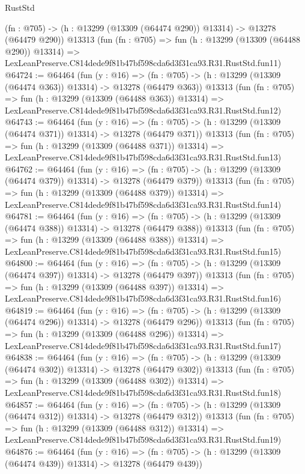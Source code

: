 \begin{lexlean}{RustStd}
\begin{coremodule}
    (fn : @705) -> (h : @13299 (@13309 (@64474 @290)) @13314) -> @13278 (@64479 @290))
    @13313
    (fun (fn : @705) =>
    fun (h : @13299 (@13309 (@64488 @290)) @13314) =>
    LexLeanPreserve.C814dede9f81b47bf598cda6d3f31ca93.R31.RustStd.fun11)
@64724 := @64464
    (fun (y : @16) =>
    (fn : @705) -> (h : @13299 (@13309 (@64474 @363)) @13314) -> @13278 (@64479 @363))
    @13313
    (fun (fn : @705) =>
    fun (h : @13299 (@13309 (@64488 @363)) @13314) =>
    LexLeanPreserve.C814dede9f81b47bf598cda6d3f31ca93.R31.RustStd.fun12)
@64743 := @64464
    (fun (y : @16) =>
    (fn : @705) -> (h : @13299 (@13309 (@64474 @371)) @13314) -> @13278 (@64479 @371))
    @13313
    (fun (fn : @705) =>
    fun (h : @13299 (@13309 (@64488 @371)) @13314) =>
    LexLeanPreserve.C814dede9f81b47bf598cda6d3f31ca93.R31.RustStd.fun13)
@64762 := @64464
    (fun (y : @16) =>
    (fn : @705) -> (h : @13299 (@13309 (@64474 @379)) @13314) -> @13278 (@64479 @379))
    @13313
    (fun (fn : @705) =>
    fun (h : @13299 (@13309 (@64488 @379)) @13314) =>
    LexLeanPreserve.C814dede9f81b47bf598cda6d3f31ca93.R31.RustStd.fun14)
@64781 := @64464
    (fun (y : @16) =>
    (fn : @705) -> (h : @13299 (@13309 (@64474 @388)) @13314) -> @13278 (@64479 @388))
    @13313
    (fun (fn : @705) =>
    fun (h : @13299 (@13309 (@64488 @388)) @13314) =>
    LexLeanPreserve.C814dede9f81b47bf598cda6d3f31ca93.R31.RustStd.fun15)
@64800 := @64464
    (fun (y : @16) =>
    (fn : @705) -> (h : @13299 (@13309 (@64474 @397)) @13314) -> @13278 (@64479 @397))
    @13313
    (fun (fn : @705) =>
    fun (h : @13299 (@13309 (@64488 @397)) @13314) =>
    LexLeanPreserve.C814dede9f81b47bf598cda6d3f31ca93.R31.RustStd.fun16)
@64819 := @64464
    (fun (y : @16) =>
    (fn : @705) -> (h : @13299 (@13309 (@64474 @296)) @13314) -> @13278 (@64479 @296))
    @13313
    (fun (fn : @705) =>
    fun (h : @13299 (@13309 (@64488 @296)) @13314) =>
    LexLeanPreserve.C814dede9f81b47bf598cda6d3f31ca93.R31.RustStd.fun17)
@64838 := @64464
    (fun (y : @16) =>
    (fn : @705) -> (h : @13299 (@13309 (@64474 @302)) @13314) -> @13278 (@64479 @302))
    @13313
    (fun (fn : @705) =>
    fun (h : @13299 (@13309 (@64488 @302)) @13314) =>
    LexLeanPreserve.C814dede9f81b47bf598cda6d3f31ca93.R31.RustStd.fun18)
@64857 := @64464
    (fun (y : @16) =>
    (fn : @705) -> (h : @13299 (@13309 (@64474 @312)) @13314) -> @13278 (@64479 @312))
    @13313
    (fun (fn : @705) =>
    fun (h : @13299 (@13309 (@64488 @312)) @13314) =>
    LexLeanPreserve.C814dede9f81b47bf598cda6d3f31ca93.R31.RustStd.fun19)
@64876 := @64464
    (fun (y : @16) =>
    (fn : @705) -> (h : @13299 (@13309 (@64474 @439)) @13314) -> @13278 (@64479 @439))

\end{coremodule}
\end{lexlean}
